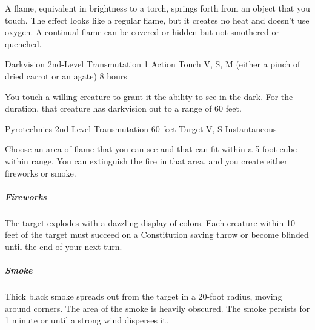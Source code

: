 {A flame, equivalent in brightness to a torch, springs forth from an object that you touch. The effect looks like a regular flame, but it creates no heat and doesn’t use oxygen. A continual flame can be covered or hidden but not smothered or quenched.

\DndSpellHeader
  {Darkvision}
  {2nd-Level Transmutation}
  {1 Action}
  {Touch}
  {V, S, M (either a pinch of dried carrot or an agate)}
  {8 hours}

You touch a willing creature to grant it the ability to see in the dark. For the duration, that creature has darkvision out to a range of 60 feet.

\DndSpellHeader
  {Pyrotechnics}
  {2nd-Level Transmutation}
  {60 feet}
  {Target}
  {V, S}
  {Instantaneous}

Choose an area of flame that you can see and that can fit within a 5-foot cube within range. You can extinguish the fire in that area, and you create either fireworks or smoke.

\subparagraph*{Fireworks} The target explodes with a dazzling display of colors. Each creature within 10 feet of the target must succeed on a Constitution saving throw or become blinded until the end of your next turn.

\subparagraph*{Smoke} Thick black smoke spreads out from the target in a 20-foot radius, moving around corners. The area of the smoke is heavily obscured. The smoke persists for 1 minute or until a strong wind disperses it.
}